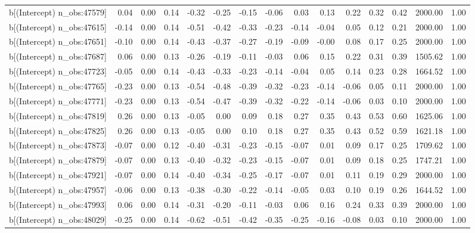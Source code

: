 \begin{table}[ht]
\begin{tabular}{rrrrrrrrrrrrrrr}
  b[(Intercept) n\_obs:47579] & 0.04 & 0.00 & 0.14 & -0.32 & -0.25 & -0.15 & -0.06 & 0.03 & 0.13 & 0.22 & 0.32 & 0.42 & 2000.00 & 1.00 \\ 
  b[(Intercept) n\_obs:47615] & -0.14 & 0.00 & 0.14 & -0.51 & -0.42 & -0.33 & -0.23 & -0.14 & -0.04 & 0.05 & 0.12 & 0.21 & 2000.00 & 1.00 \\ 
  b[(Intercept) n\_obs:47651] & -0.10 & 0.00 & 0.14 & -0.43 & -0.37 & -0.27 & -0.19 & -0.09 & -0.00 & 0.08 & 0.17 & 0.25 & 2000.00 & 1.00 \\ 
  b[(Intercept) n\_obs:47687] & 0.06 & 0.00 & 0.13 & -0.26 & -0.19 & -0.11 & -0.03 & 0.06 & 0.15 & 0.22 & 0.31 & 0.39 & 1505.62 & 1.00 \\ 
  b[(Intercept) n\_obs:47723] & -0.05 & 0.00 & 0.14 & -0.43 & -0.33 & -0.23 & -0.14 & -0.04 & 0.05 & 0.14 & 0.23 & 0.28 & 1664.52 & 1.00 \\ 
  b[(Intercept) n\_obs:47765] & -0.23 & 0.00 & 0.13 & -0.54 & -0.48 & -0.39 & -0.32 & -0.23 & -0.14 & -0.06 & 0.05 & 0.11 & 2000.00 & 1.00 \\ 
  b[(Intercept) n\_obs:47771] & -0.23 & 0.00 & 0.13 & -0.54 & -0.47 & -0.39 & -0.32 & -0.22 & -0.14 & -0.06 & 0.03 & 0.10 & 2000.00 & 1.00 \\ 
  b[(Intercept) n\_obs:47819] & 0.26 & 0.00 & 0.13 & -0.05 & 0.00 & 0.09 & 0.18 & 0.27 & 0.35 & 0.43 & 0.53 & 0.60 & 1625.06 & 1.00 \\ 
  b[(Intercept) n\_obs:47825] & 0.26 & 0.00 & 0.13 & -0.05 & 0.00 & 0.10 & 0.18 & 0.27 & 0.35 & 0.43 & 0.52 & 0.59 & 1621.18 & 1.00 \\ 
  b[(Intercept) n\_obs:47873] & -0.07 & 0.00 & 0.12 & -0.40 & -0.31 & -0.23 & -0.15 & -0.07 & 0.01 & 0.09 & 0.17 & 0.25 & 1709.62 & 1.00 \\ 
  b[(Intercept) n\_obs:47879] & -0.07 & 0.00 & 0.13 & -0.40 & -0.32 & -0.23 & -0.15 & -0.07 & 0.01 & 0.09 & 0.18 & 0.25 & 1747.21 & 1.00 \\ 
  b[(Intercept) n\_obs:47921] & -0.07 & 0.00 & 0.14 & -0.40 & -0.34 & -0.25 & -0.17 & -0.07 & 0.01 & 0.11 & 0.19 & 0.29 & 2000.00 & 1.00 \\ 
  b[(Intercept) n\_obs:47957] & -0.06 & 0.00 & 0.13 & -0.38 & -0.30 & -0.22 & -0.14 & -0.05 & 0.03 & 0.10 & 0.19 & 0.26 & 1644.52 & 1.00 \\ 
  b[(Intercept) n\_obs:47993] & 0.06 & 0.00 & 0.14 & -0.31 & -0.20 & -0.11 & -0.03 & 0.06 & 0.16 & 0.24 & 0.33 & 0.39 & 2000.00 & 1.00 \\ 
  b[(Intercept) n\_obs:48029] & -0.25 & 0.00 & 0.14 & -0.62 & -0.51 & -0.42 & -0.35 & -0.25 & -0.16 & -0.08 & 0.03 & 0.10 & 2000.00 & 1.00 \\ 

\end{tabular}
\end{table}
